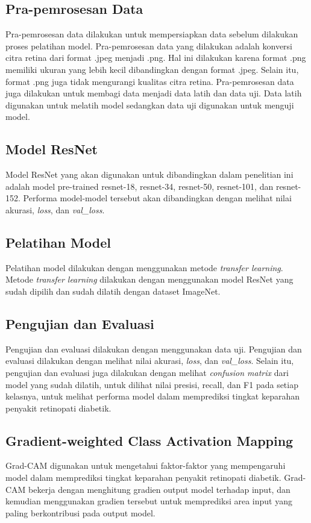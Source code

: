 \subsection{Pra-pemrosesan Data}
Pra-pemrosesan data dilakukan untuk mempersiapkan data sebelum dilakukan proses pelatihan model. Pra-pemrosesan data yang dilakukan adalah konversi citra retina dari format .jpeg menjadi .png. Hal ini dilakukan karena format .png memiliki ukuran yang lebih kecil dibandingkan dengan format .jpeg. Selain itu, format .png juga tidak mengurangi kualitas citra retina. Pra-pemrosesan data juga dilakukan untuk membagi data menjadi data latih dan data uji. Data latih digunakan untuk melatih model sedangkan data uji digunakan untuk menguji model.

\subsection{ Model ResNet}
Model ResNet yang akan digunakan untuk dibandingkan dalam penelitian ini adalah model pre-trained resnet-18, resnet-34, resnet-50, resnet-101, dan resnet-152. Performa model-model tersebut akan dibandingkan dengan melihat nilai akurasi, \emph{loss}, dan \emph{val\_loss}.

\subsection{Pelatihan Model}
Pelatihan model dilakukan dengan menggunakan metode \emph{transfer learning}. Metode \emph{transfer learning} dilakukan dengan menggunakan model ResNet yang sudah dipilih dan sudah dilatih dengan dataset ImageNet.

\subsection{Pengujian dan Evaluasi}
Pengujian dan evaluasi dilakukan dengan menggunakan data uji. Pengujian dan evaluasi dilakukan dengan melihat nilai akurasi, \emph{loss}, dan \emph{val\_loss}. Selain itu, pengujian dan evaluasi juga dilakukan dengan melihat \emph{confusion matrix} dari model yang sudah dilatih, untuk dilihat nilai presisi, recall, dan F1 pada setiap kelasnya, untuk melihat performa model dalam memprediksi tingkat keparahan penyakit retinopati diabetik.

\subsection{Gradient-weighted Class Activation Mapping}
Grad-CAM digunakan untuk mengetahui faktor-faktor yang mempengaruhi model dalam memprediksi tingkat keparahan penyakit retinopati diabetik. Grad-CAM bekerja dengan menghitung gradien output model terhadap input, dan kemudian menggunakan gradien tersebut untuk memprediksi area input yang paling berkontribusi pada output model.
